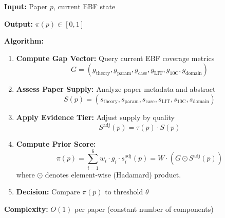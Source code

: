 \begin{tcolorbox}[colback=red!5!white, colframe=red!75!black,
    title=\textbf{Theorem 2: Prior Score Computation (Algorithm)}]

\textbf{Input:} Paper $p$, current EBF state

\textbf{Output:} $\pi(p) \in [0, 1]$

\textbf{Algorithm:}
\begin{enumerate}[nosep]
    \item \textbf{Compute Gap Vector:} Query current EBF coverage metrics
    \begin{equation}
    G = (g_{\text{theory}}, g_{\text{param}}, g_{\text{case}}, g_{\text{LIT}}, g_{\text{10C}}, g_{\text{domain}})
    \end{equation}

    \item \textbf{Assess Paper Supply:} Analyze paper metadata and abstract
    \begin{equation}
    S(p) = (s_{\text{theory}}, s_{\text{param}}, s_{\text{case}}, s_{\text{LIT}}, s_{\text{10C}}, s_{\text{domain}})
    \end{equation}

    \item \textbf{Apply Evidence Tier:} Adjust supply by quality
    \begin{equation}
    S^{\text{adj}}(p) = \tau(p) \cdot S(p)
    \end{equation}

    \item \textbf{Compute Prior Score:}
    \begin{equation}
    \pi(p) = \sum_{i=1}^{6} w_i \cdot g_i \cdot s_i^{\text{adj}}(p) = W \cdot (G \odot S^{\text{adj}}(p))
    \end{equation}
    where $\odot$ denotes element-wise (Hadamard) product.

    \item \textbf{Decision:} Compare $\pi(p)$ to threshold $\theta$
\end{enumerate}

\textbf{Complexity:} $O(1)$ per paper (constant number of components)

\end{tcolorbox}

